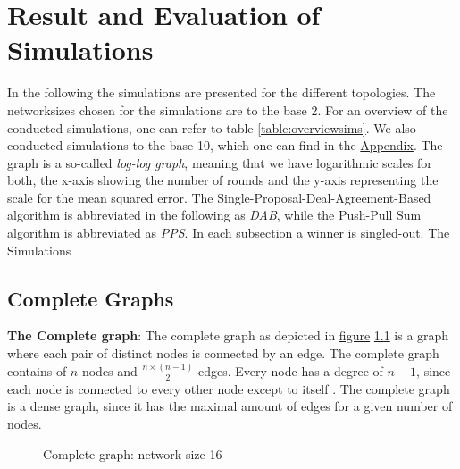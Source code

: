 \chapter{Result and Evaluation of Simulations}\label{chap:results}
In the following the simulations are presented for the different topologies. The networksizes chosen for the simulations are to the base 2. For an overview of the conducted simulations, one can refer to table \ref{table:overviewsims}. We also conducted simulations to the base 10, which one can find in the \hyperref[chap:appendix]{Appendix}.
The graph is a so-called \textit{log-log graph}, meaning that we have logarithmic scales for both, the x-axis showing the number of rounds and the y-axis representing the scale for the mean squared error. The Single-Proposal-Deal-Agreement-Based algorithm is abbreviated in the following as \textit{DAB}, while the Push-Pull Sum algorithm is abbreviated as \textit{PPS}. In each subsection a winner is singled-out. The Simulations

\section{Complete Graphs}
\textbf{The Complete graph}: The complete graph as depicted in \hyperref[fig:completegraphDemo]{figure} \ref{fig:completegraphDemo} is a graph where each pair of distinct nodes is connected by an edge. The complete graph contains of $n$ nodes and $\frac{n\times(n-1)}{2}$ edges. Every node has a degree of $n-1$, since each node is connected to every other node except to itself \cite{GraphTheorySchindelhaauer2021}. The complete graph is a dense graph, since it has the maximal amount of edges for a given number of nodes.
\begin{figure}
    \centering
    
    \caption{Complete graph: network size 16}
    \label{fig:completegraphDemo}
\end{figure}
